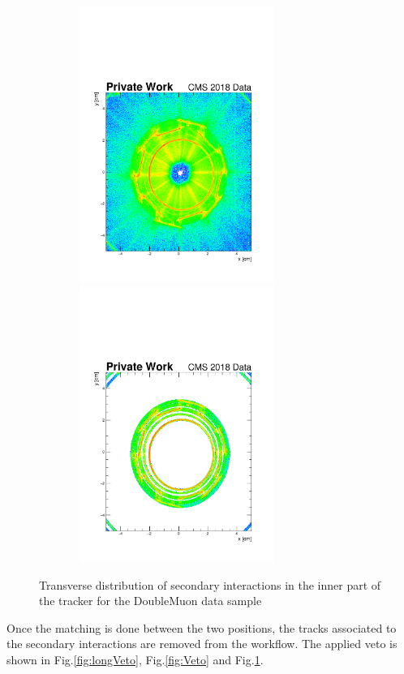 \documentclass{cernatlasnote}
\begin{document}
\begin{figure}[ht]
\hspace{-1 cm}
\includegraphics[height=9cm, width=9cm, trim= 0cm 0cm 0cm 0.cm,clip]{images/SecInt/DoubleMuon_UL2018_MiniAODv2_GT36-v1_hData_reco_SecInt_xy_Inner_Selec.pdf}\includegraphics[height=9cm, width=9cm, trim= 0cm 0cm 0cm 0.cm,clip]{images/SecInt/DoubleMuon_UL2018_MiniAODv2_GT36-v1_hData_reco_SecInt_xy_Inner_TrackerMatched.pdf}
\caption{\label{fig:InnerVeto} Transverse distribution of secondary interactions in the inner part of the tracker for the DoubleMuon data sample}
\end{figure}
        \FloatBarrier

    Once the matching is done between the two positions, the tracks associated to the secondary interactions are removed from the workflow. The applied veto is shown in Fig.\ref{fig:longVeto}, Fig.\ref{fig:Veto} and  Fig.\ref{fig:InnerVeto}.
        
\end{document}
